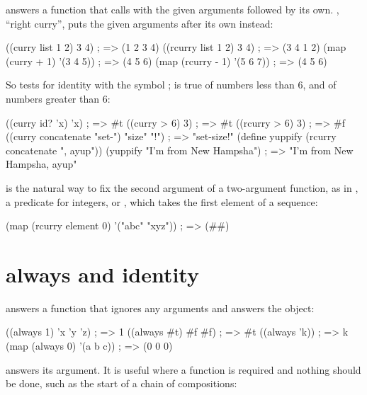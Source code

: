  answers a function that
calls  with the given arguments followed by its own.
, ``right curry'', puts the given arguments after its own
instead:

\begin{dylan}
((curry list 1 2) 3 4)             ; => (1 2 3 4)
((rcurry list 1 2) 3 4)            ; => (3 4 1 2)
(map (curry + 1) '(3 4 5))         ; => (4 5 6)
(map (rcurry - 1) '(5 6 7))        ; => (4 5 6)
\end{dylan}

\noindent So  tests for identity with the symbol
;  is true of numbers less than 6, and
 of numbers greater than 6:

\begin{dylan}
((curry id? 'x) 'x)                ; => #t
((curry > 6) 3)                    ; => #t
((rcurry > 6) 3)                   ; => #f
((curry concatenate "set-") "size" "!")    ; => "set-size!"
(define yuppify (rcurry concatenate ", ayup"))
(yuppify "I'm from New Hampsha")   ; => "I'm from New Hampsha, ayup"
\end{dylan}

\noindent {} is the natural way to fix the second argument of
a two-argument function, as in , a
predicate for integers, or , which takes the
first element of a sequence:

\begin{dylan}
(map (rcurry element 0) '("abc" "xyz"))    ; => (#\a #\x)
\end{dylan}

\section{always and identity}\label{sec:functional-always}

 answers a function that ignores any
arguments and answers the object:

\begin{dylan}
((always 1) 'x 'y 'z)       ; => 1
((always #t) #f #f)         ; => #t
((always 'k))               ; => k
(map (always 0) '(a b c))   ; => (0 0 0)
\end{dylan}

 answers its argument. It is useful
where a function is required and nothing should be done, such as the
start of a chain of compositions:

